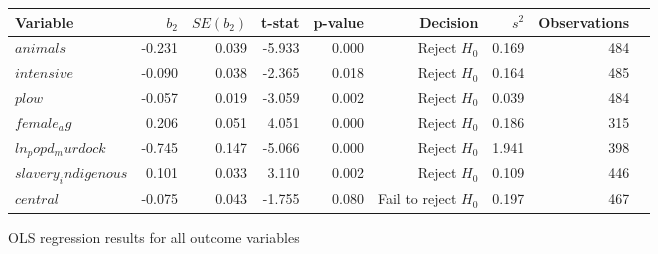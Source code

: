 \centering
\begin{tabular}{lrrrrrrrl}
\hline
Variable & $b_2$ & $SE(b_2)$ & t-stat & p-value & Decision & $s^2$ & Observations \\
\hline
$animals$ & -0.231 & 0.039 & -5.933 & 0.000 & Reject $H_0$ & 0.169 & 484\\
$intensive$ & -0.090 & 0.038 & -2.365 & 0.018 & Reject $H_0$ & 0.164 & 485\\
$plow$ & -0.057 & 0.019 & -3.059 & 0.002 & Reject $H_0$ & 0.039 & 484\\
$female_ag$ & 0.206 & 0.051 & 4.051 & 0.000 & Reject $H_0$ & 0.186 & 315\\
$ln_popd_murdock$ & -0.745 & 0.147 & -5.066 & 0.000 & Reject $H_0$ & 1.941 & 398\\
$slavery_indigenous$ & 0.101 & 0.033 & 3.110 & 0.002 & Reject $H_0$ & 0.109 & 446\\
$central$ & -0.075 & 0.043 & -1.755 & 0.080 & Fail to reject $H_0$ & 0.197 & 467\\
\hline
\end{tabular}
\caption{OLS regression results for all outcome variables}
\label{tab:regression_results}
